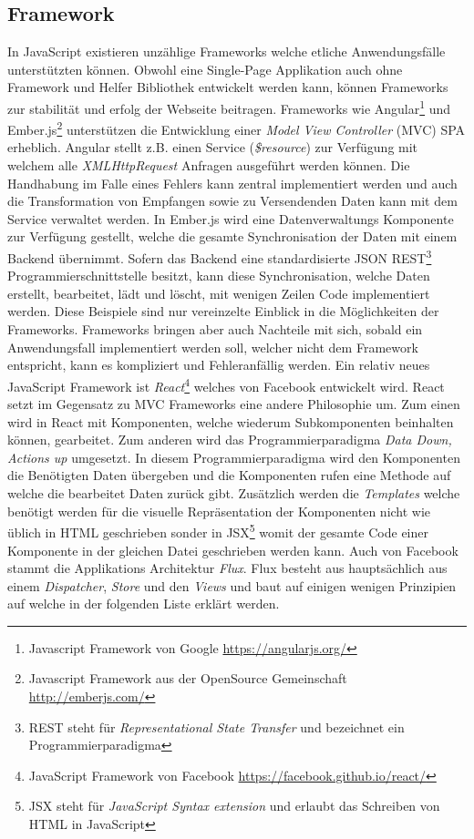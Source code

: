 \subsection{Framework}
In JavaScript existieren unzählige Frameworks welche etliche Anwendungsfälle unterstützten können. Obwohl eine Single-Page Applikation auch ohne Framework und Helfer Bibliothek entwickelt werden kann, können Frameworks zur stabilität und erfolg der Webseite beitragen. Frameworks wie Angular\footnote{Javascript Framework von Google \url{https://angularjs.org/}} und Ember.js\footnote{Javascript Framework aus der OpenSource Gemeinschaft \url{http://emberjs.com/}} unterstützen die Entwicklung einer \textit{Model View Controller} (MVC) SPA erheblich. Angular stellt z.B. einen Service (\textit{\$resource}) zur Verfügung mit welchem alle \textit{XMLHttpRequest} Anfragen ausgeführt werden können. Die Handhabung im Falle eines Fehlers kann zentral implementiert werden und auch die Transformation von Empfangen sowie zu Versendenden Daten kann mit dem Service verwaltet werden. In Ember.js wird eine Datenverwaltungs Komponente zur Verfügung gestellt, welche die gesamte Synchronisation der Daten mit einem Backend übernimmt. Sofern das Backend eine standardisierte JSON REST\footnote{REST steht für \textit{Representational State Transfer} und bezeichnet ein Programmierparadigma} Programmierschnittstelle besitzt, kann diese Synchronisation, welche Daten erstellt, bearbeitet, lädt und löscht, mit wenigen Zeilen Code implementiert werden. Diese Beispiele sind nur vereinzelte Einblick in die Möglichkeiten der Frameworks. Frameworks bringen aber auch Nachteile mit sich, sobald ein Anwendungsfall implementiert werden soll, welcher nicht dem Framework entspricht, kann es kompliziert und Fehleranfällig werden.
\newline{}
Ein relativ neues JavaScript Framework ist \textit{React}\footnote{JavaScript Framework von Facebook \url{https://facebook.github.io/react/}} welches von Facebook entwickelt wird. React setzt im Gegensatz zu MVC Frameworks eine andere Philosophie um. Zum einen wird in React mit Komponenten, welche wiederum Subkomponenten beinhalten können, gearbeitet. Zum anderen wird das Programmierparadigma \textit{Data Down, Actions up} umgesetzt. In diesem Programmierparadigma wird den Komponenten die Benötigten Daten übergeben und die Komponenten rufen eine Methode auf welche die bearbeitet Daten zurück gibt. Zusätzlich werden die \textit{Templates} welche benötigt werden für die visuelle Repräsentation der Komponenten nicht wie üblich in HTML geschrieben sonder in JSX\footnote{JSX steht für \textit{JavaScript Syntax extension} und erlaubt das Schreiben von HTML in JavaScript} womit der gesamte Code einer Komponente in der gleichen Datei geschrieben werden kann. Auch von Facebook stammt die Applikations Architektur \textit{Flux}. Flux besteht aus hauptsächlich aus einem \textit{Dispatcher}, \textit{Store} und den \textit{Views} und baut auf einigen wenigen Prinzipien auf welche in der folgenden Liste erklärt werden.

